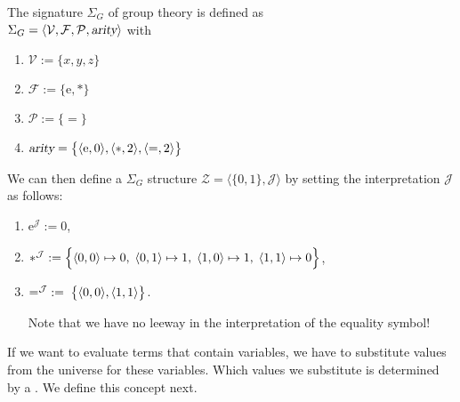 \exampleEng
The signature $\Sigma_G$ of group theory is defined as \\[0.2cm]
\hspace*{1.3cm} $\Sigma_G = \langle \mathcal{V}, \mathcal{F}, \mathcal{P},\textsl{arity}\rangle$ 
\quad with
\begin{enumerate}
\item $\mathcal{V} := \{ x, y, z \}$
\item $\mathcal{F} := \{ \mathrm{e}, * \}$
\item $\mathcal{P} := \{ \mathtt{=} \}$
\item $\textsl{arity} = \bigl\{ \pair(\mathrm{e},0), \pair(*,2), \pair(\mathtt{=},2)\bigr\}$
\end{enumerate}
We can then define a $\Sigma_G$ structure $\mathcal{Z} = \langle \{0,1\},\mathcal{J}\rangle$ 
by setting the interpretation $\mathcal{J}$ 
as follows:
\begin{enumerate}
\item $\mathrm{e}^\mathcal{J} := 0$,
\item $*^\mathcal{J} := \Bigl\{ \pair(0,0) \mapsto 0,\;
                                 \pair(0,1) \mapsto 1,\;
                                 \pair(1,0) \mapsto 1,\;
                                 \pair(1,1) \mapsto 0 \Bigr\}$,
\item $=^\mathcal{J} \;:=\; \bigl\{ \pair(0,0), \pair(1,1) \bigr\}$.
                                 
      Note that we have no leeway in the interpretation of the equality symbol! \eox
\end{enumerate}

If we want to evaluate terms that contain variables, we have to substitute values from the universe 
for these variables. Which values we substitute is determined by a .  We define this concept next. 

